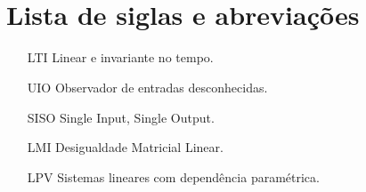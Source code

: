 \section{\\Lista de siglas e abreviações}
    \begin{itemize} 
        \item [LTI] Linear e invariante no tempo.
        \item [UIO] Observador de entradas desconhecidas.
        \item [SISO] Single Input, Single Output.
        \item [LMI] Desigualdade Matricial Linear.
        \item [LPV] Sistemas lineares com dependência paramétrica.
    \end{itemize}
\FloatBarrier
